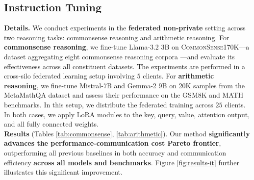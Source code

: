 \subsection{Instruction Tuning}
\quad \textbf{Details.} 
We conduct experiments in the \textbf{federated non-private} setting across two reasoning tasks: commonsense reasoning and arithmetic reasoning. 
For \textbf{commonsense reasoning}, we fine-tune Llama-3.2 3B on \textsc{CommonSense170K}—a dataset aggregating eight commonsense reasoning corpora \citep{cr-dataset}—and evaluate its effectiveness across all constituent datasets. The experiments are performed in a cross-silo federated learning setup involving $5$ clients. 
For \textbf{arithmetic reasoning}, we fine-tune Mistral-7B \citep{mistral7b} and Gemma-2 9B \citep{gemma2} on 20K samples from the MetaMathQA dataset \citep{metamathqa} and assess their performance on the GSM8K \citep{gsm8k} and MATH \citep{math} benchmarks. In this setup, we distribute the federated training across $25$ clients.   
In both cases, we apply LoRA modules to the key, query, value, attention output, and all fully connected weights. 
\\

\textbf{Results} (Tables \ref{tab:commonsense}, \ref{tab:arithmetic}).
Our method \textbf{significantly advances the performance-communication cost Pareto frontier}, outperforming all previous baselines in both accuracy and communication efficiency \textbf{across all models and benchmarks}.
Figure \ref{fig:results-it} further illustrates this significant improvement.

